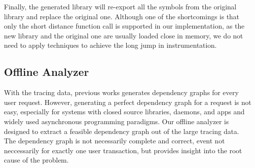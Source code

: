 Finally, the generated library will re-export all the symbols from the original library and replace the original one.
Although one of the shortcomings is that only the short distance function call is supported in our implementation, as the new library and the original one are usually loaded close in memory, we do not need to apply techniques to achieve the long jump in instrumentation.\par
\subsection{Offline Analyzer}
With the tracing data, previous works\cite{magpie, panappticon} generates dependency graphs for every user request.
However, generating a perfect dependency graph for a request is not easy, especially for systems with closed source libraries, daemons, and apps and widely used asynchronous programming paradigms.
Our offline analyzer is designed to extract a feasible dependency graph out of the large tracing data.
The dependency graph is not necessarily complete and correct, event not neccessarily for exactly one user transaction, but provides insight into the root cause of the problem.\par
